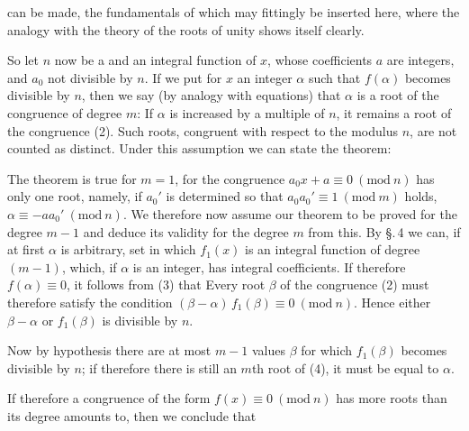 
can be made, the fundamentals of which may fittingly be inserted
here, where the analogy with the theory of the roots of unity
shows itself clearly.

So let $n$ now be a  and
an integral function of $x$, whose coefficients $a$ are integers,
and $a_0$ not divisible by $n$. If we put for $x$ an integer
$\alpha$ such that $f(\alpha)$ becomes divisible by $n$, then we
say (by analogy with equations) that $\alpha$ is a root of the
congruence of degree $m$:
If $\alpha$ is increased by a multiple of $n$, it remains a root
of the congruence (2). Such roots, congruent with respect to the
modulus $n$, are not counted as distinct. Under this assumption
we can state the theorem:


The theorem is true for $m = 1$, for the congruence $a_0 x + a
\equiv 0\ (\mathrm{mod}\ n)$ has only one root, namely, if
$a_0'$ is determined so that $a_0 a_0' \equiv 1\ (\mathrm{mod}\ m)$
holds, $\alpha \equiv -a a_0'\ (\mathrm{mod}\ n)$. We therefore
now assume our theorem to be proved for the degree $m-1$ and
deduce its validity for the degree $m$ from this. By \S.\,4 we
can, if at first $\alpha$ is arbitrary, set
in which $f_1(x)$ is an integral function of degree $(m-1)$,
which, if $\alpha$ is an integer, has integral
coefficients. If therefore $f(\alpha) \equiv 0$, it follows
from (3) that
Every root $\beta$ of the congruence (2) must therefore satisfy
the condition $(\beta - \alpha)\, f_1(\beta) \equiv 0\ (\mathrm{mod}\ n)$.
Hence either $\beta - \alpha$ or $f_1(\beta)$ is
divisible by $n$.

Now by hypothesis there are at most $m-1$ values $\beta$
for which $f_1(\beta)$ becomes divisible by $n$; if therefore
there is still an $m$th root of (4), it must be equal to $\alpha$.

If therefore a congruence of the form $f(x) \equiv 0\ (\mathrm{mod}\
n)$ has more roots than its degree amounts to, then we conclude
that
